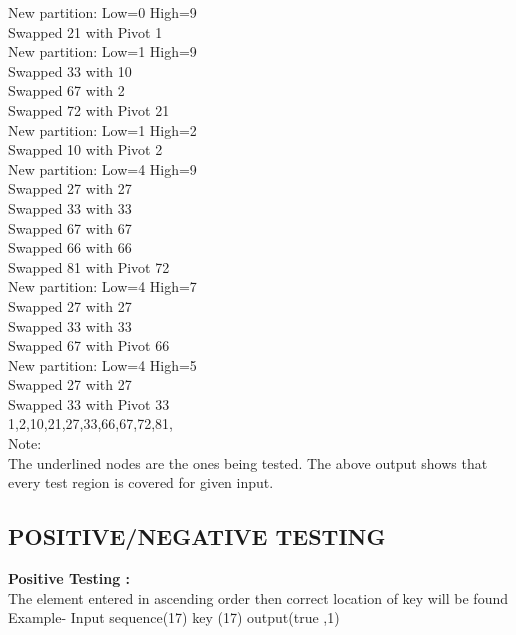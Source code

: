 \documentclass{article}
\begin{document}
{{			\noindent
			New partition: Low=0 High=9\\
			Swapped 21 with Pivot 1\\
			
			\noindent
			New partition: Low=1 High=9\\
			Swapped 33 with 10\\
			Swapped 67 with 2\\
			Swapped 72 with Pivot 21\\
			
			\noindent
			New partition: Low=1 High=2\\
			Swapped 10 with Pivot 2\\
			
			\noindent
			New partition: Low=4 High=9\\
			Swapped 27 with 27\\
			Swapped 33 with 33\\
			Swapped 67 with 67\\
			Swapped 66 with 66\\
			Swapped 81 with Pivot 72\\
			
			\noindent
			New partition: Low=4 High=7\\
			Swapped 27 with 27\\
			Swapped 33 with 33\\
			Swapped 67 with Pivot 66\\
			
			\noindent
			New partition: Low=4 High=5\\
			Swapped 27 with 27\\
			Swapped 33 with Pivot 33\\
			
			1,2,10,21,27,33,66,67,72,81,\\
			Note: \\
			The underlined nodes are the ones being tested.
			The above output shows that every test region is covered for given input.\\ 
			
			
			\subsection{ POSITIVE/NEGATIVE TESTING }
			
			\textbf{Positive Testing :}\\
			The element entered in ascending order then correct location of key will be found\\ 
			Example- Input  sequence(17)       key (17)         output(true ,1)\\ 
			
}}
\end{document}
